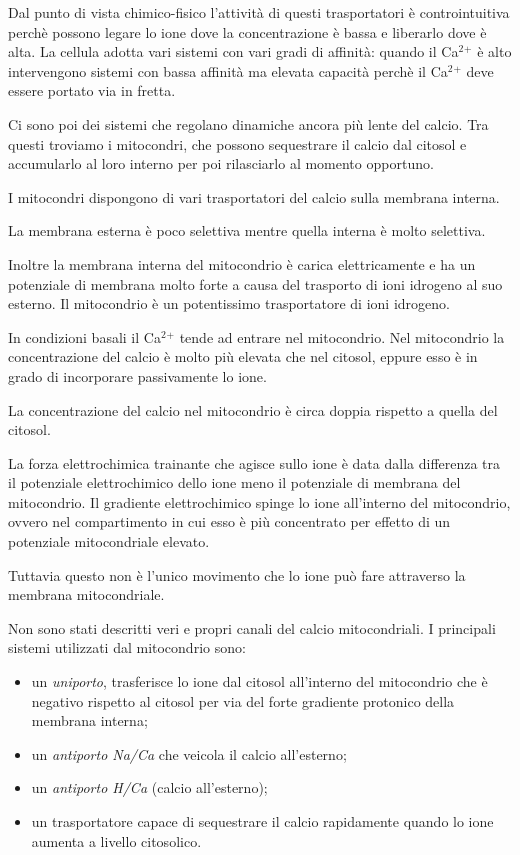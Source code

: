 \documentclass[]{article}
\begin{document}
Dal punto di vista chimico-fisico l'attività di questi trasportatori è
controintuitiva perchè possono legare lo ione dove la concentrazione è
bassa e liberarlo dove è alta. La cellula adotta vari sistemi con vari
gradi di affinità: quando il Ca\(^2\)\(^+\) è alto intervengono sistemi
con bassa affinità ma elevata capacità perchè il Ca\(^2\)\(^+\) deve
essere portato via in fretta.

Ci sono poi dei sistemi che regolano dinamiche ancora più lente del
calcio. Tra questi troviamo i mitocondri, che possono sequestrare il
calcio dal citosol e accumularlo al loro interno per poi rilasciarlo al
momento opportuno.

I mitocondri dispongono di vari trasportatori del calcio sulla membrana
interna.

La membrana esterna è poco selettiva mentre quella interna è molto
selettiva.

Inoltre la membrana interna del mitocondrio è carica elettricamente e ha
un potenziale di membrana molto forte a causa del trasporto di ioni
idrogeno al suo esterno. Il mitocondrio è un potentissimo trasportatore
di ioni idrogeno.

In condizioni basali il Ca\(^2\)\(^+\) tende ad entrare nel mitocondrio.
Nel mitocondrio la concentrazione del calcio è molto più elevata che nel
citosol, eppure esso è in grado di incorporare passivamente lo ione.

La concentrazione del calcio nel mitocondrio è circa doppia rispetto a
quella del citosol.

La forza elettrochimica trainante che agisce sullo ione è data dalla
differenza tra il potenziale elettrochimico dello ione meno il
potenziale di membrana del mitocondrio. Il gradiente elettrochimico
spinge lo ione all'interno del mitocondrio, ovvero nel compartimento in
cui esso è più concentrato per effetto di un potenziale mitocondriale
elevato.

Tuttavia questo non è l'unico movimento che lo ione può fare attraverso
la membrana mitocondriale.

Non sono stati descritti veri e propri canali del calcio mitocondriali.
I principali sistemi utilizzati dal mitocondrio sono:

\begin{itemize}
\itemsep1pt\parskip0pt
\item
  un \emph{uniporto}, trasferisce lo ione dal citosol all'interno del
  mitocondrio che è negativo rispetto al citosol per via del forte
  gradiente protonico della membrana interna;
\item
  un \emph{antiporto Na/Ca} che veicola il calcio all'esterno;
\item
  un \emph{antiporto H/Ca} (calcio all'esterno);
\item
  un trasportatore capace di sequestrare il calcio rapidamente quando lo
  ione aumenta a livello citosolico.
\end{itemize}
\end{document}
